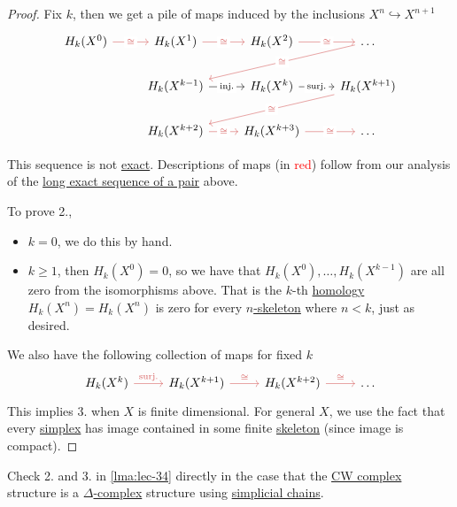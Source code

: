 \begin{proof}
	Fix \(k\), then we get a pile of maps induced by the inclusions \(X^n \hookrightarrow X^{n + 1}\)
	\[
		\begin{tikzcd}
			{H_k(X^0)} & {H_k(X^1)} & {H_k(X^2)} & \ldots \\
			& {H_k(X^{k-1})} & {H_k(X^{k})} & {H_k(X^{k+1})} \\
			& {H_k(X^{k+2})} & {H_k(X^{k+3})} & \ldots
			\arrow["\cong"{description}, color={rgb,255:red,214;green,92;blue,92}, from=1-4, to=2-2]
			\arrow["{\text{inj.}}"{description}, from=2-2, to=2-3]
			\arrow["{\text{surj.}}"{description}, from=2-3, to=2-4]
			\arrow["\cong"{description}, color={rgb,255:red,214;green,92;blue,92}, from=2-4, to=3-2]
			\arrow["\cong"{description}, color={rgb,255:red,214;green,92;blue,92}, from=3-2, to=3-3]
			\arrow["\cong"{description}, color={rgb,255:red,214;green,92;blue,92}, from=3-3, to=3-4]
			\arrow["\cong"{description}, color={rgb,255:red,214;green,92;blue,92}, from=1-1, to=1-2]
			\arrow["\cong"{description}, color={rgb,255:red,214;green,92;blue,92}, from=1-2, to=1-3]
			\arrow["\cong"{description}, color={rgb,255:red,214;green,92;blue,92}, from=1-3, to=1-4]
		\end{tikzcd}
	\]
	\begin{note}
		This sequence is not \hyperref[def:exact-sequence]{exact}. Descriptions of maps (in \textcolor{red}{red}) follow
		from our analysis of the \hyperref[thm:long-exact-sequence-of-a-pair]{long exact sequence of a pair} above.
	\end{note}

	To prove 2.,
	\begin{itemize}
		\item \(k = 0\), we do this by hand.
		\item \(k \geq 1\), then \(H_k(X^0) = 0\), so we have that \(H_k(X^0), \ldots, H_k(X^{k - 1})\) are all zero from the
		      isomorphisms above. That is the \(k\)-th \hyperref[def:singular-homology-group]{homology} \(H_k(X^n) = H_k(X^n)\)
		      is zero for every \hyperref[def:skeleton]{\(n\)-skeleton} where \(n < k\), just as desired.
	\end{itemize}
	We also have the following collection of maps for fixed \(k\)
	\[
		\begin{tikzcd}
			{H_k(X^k)} & {H_k(X^{k+1})} & {H_k(X^{k+2})} & \ldots
			\arrow["{\text{surj.}}", color={rgb,255:red,214;green,92;blue,92}, from=1-1, to=1-2]
			\arrow["\cong", color={rgb,255:red,214;green,92;blue,92}, from=1-2, to=1-3]
			\arrow["\cong", color={rgb,255:red,214;green,92;blue,92}, from=1-3, to=1-4]
		\end{tikzcd}
	\]
	This implies 3. when \(X\) is finite dimensional. For general \(X\), we use the fact that every \hyperref[def:standard-simplex]{simplex}
	has image contained in some finite \hyperref[def:skeleton]{skeleton} (since image is compact).
\end{proof}
\begin{exercise}
	Check 2. and 3. in \autoref{lma:lec-34} directly in the case that the \hyperref[def:CW-Complex]{CW complex} structure is a \hyperref[def:delta-complex]{\(\Delta\)-complex}
	structure using \hyperref[def:simplicial-chain-group]{simplicial chains}.
\end{exercise}

